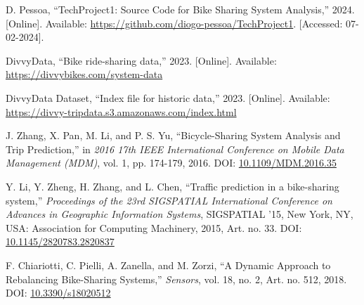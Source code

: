 \begin{thebibliography}{24}

    D. Pessoa, ``TechProject1: Source Code for Bike Sharing System Analysis,'' 2024.
    [Online].
    Available: \url{https://github.com/diogo-pessoa/TechProject1}.
    [Accessed: 07-02-2024].

    DivvyData, ``Bike ride-sharing data,'' 2023.
    [Online].
    Available: \url{https://divvybikes.com/system-data}

    DivvyData Dataset, ``Index file for historic data,'' 2023.
    [Online].
    Available: \url{https://divvy-tripdata.s3.amazonaws.com/index.html}

    J. Zhang, X. Pan, M. Li, and P. S. Yu, ``Bicycle-Sharing System Analysis and Trip Prediction,'' in \textit{2016 17th IEEE International Conference on Mobile Data Management (MDM)}, vol.
    1, pp.
    174-179, 2016.
    DOI: \href{https://doi.org/10.1109/MDM.2016.35}{10.1109/MDM.2016.35}

    Y. Li, Y. Zheng, H. Zhang, and L. Chen, ``Traffic prediction in a bike-sharing system,'' \textit{Proceedings of the 23rd SIGSPATIAL International Conference on Advances in Geographic Information Systems}, SIGSPATIAL '15, New York, NY, USA: Association for Computing Machinery, 2015, Art.
    no.
    33.
    DOI: \href{https://doi.org/10.1145/2820783.2820837}{10.1145/2820783.2820837}

    F. Chiariotti, C. Pielli, A. Zanella, and M. Zorzi, ``A Dynamic Approach to Rebalancing Bike-Sharing Systems,'' \textit{Sensors}, vol.
    18, no.
            2, Art.
            no.
            512, 2018.
            DOI: \href{https://www.mdpi.com/1424-8220/18/2/512}{10.3390/s18020512}

\end{thebibliography}

